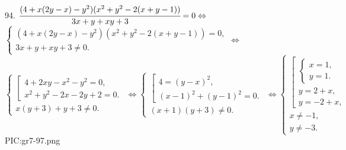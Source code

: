 94. $\cfrac{(4+x(2y-x)-y^2)(x^2+y^2-2(x+y-1))}{3x+y+xy+3}=0\Leftrightarrow$\\$
\begin{cases}

(4+x(2y-x)-y^2)(x^2+y^2-2(x+y-1))=0,\\
3x+y+xy+3\neq0.
\end{cases}\Leftrightarrow$\\$
\begin{cases}
\left[\begin{array}{l}
4+2xy-x^2-y^2=0,\\
x^2+y^2-2x-2y+2=0.
\end{array}\right.\\
x(y+3)+y+3\neq0.
\end{cases}\Leftrightarrow
\begin{cases}
\left[\begin{array}{l}
4=(y-x)^2,\\
(x-1)^2+(y-1)^2=0.
\end{array}\right.\\
(x+1)(y+3)\neq0.
\end{cases}\Leftrightarrow
\begin{cases}
\left[\begin{array}{l}
\begin{cases}
x=1,\\
y=1.
\end{cases}\\
y=2+x,\\
y=-2+x,
\end{array}\right.\\
x\neq-1,\\
y\neq-3.
\end{cases}$
{{PIC:gr7-97.png}}\\
